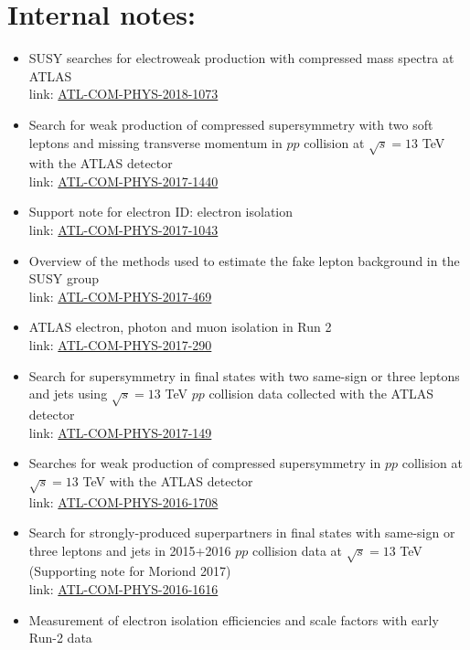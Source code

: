 \documentclass[12pt]{article}
\begin{document}
\section{Internal notes:}
\begin{itemize}
\item SUSY searches for electroweak production with compressed mass spectra at ATLAS\\
      link: \href{https://cds.cern.ch/record/2631591}{ATL-COM-PHYS-2018-1073}
\item Search for weak production of compressed supersymmetry with two soft leptons and missing transverse momentum in $pp$ collision at $\sqrt{s} = 13$ TeV with the ATLAS detector\\
      link: \href{https://cds.cern.ch/record/2284973}{ATL-COM-PHYS-2017-1440}
\item Support note for electron ID: electron isolation\\
      link: \href{https://cds.cern.ch/record/2274466}{ATL-COM-PHYS-2017-1043}
\item Overview of the methods used to estimate the fake lepton background in the SUSY group\\
      link: \href{https://cds.cern.ch/record/2261709}{ATL-COM-PHYS-2017-469}
\item ATLAS electron, photon and muon isolation in Run 2\\
      link: \href{https://cds.cern.ch/record/2256658}{ATL-COM-PHYS-2017-290}
\item Search for supersymmetry in final states with two same-sign or three leptons and jets using $\sqrt{s} = 13$ TeV $pp$ collision data collected with the ATLAS detector\\
      link: \href{https://cds.cern.ch/record/2252643}{ATL-COM-PHYS-2017-149}
\item Searches for weak production of compressed supersymmetry in $pp$ collision at $\sqrt{s} = 13$ TeV with the ATLAS detector\\
      link: \href{https://cds.cern.ch/record/2235272}{ATL-COM-PHYS-2016-1708}
\item Search for strongly-produced superpartners in final states with same-sign or three leptons and jets in 2015+2016 $pp$ collision data at $\sqrt{s} = 13$ TeV (Supporting note for Moriond 2017)\\
      link: \href{https://cds.cern.ch/record/2231789}{ATL-COM-PHYS-2016-1616}
\item Measurement of electron isolation efficiencies and scale factors with early Run-2 data\\

\end{itemize}
\end{document}
